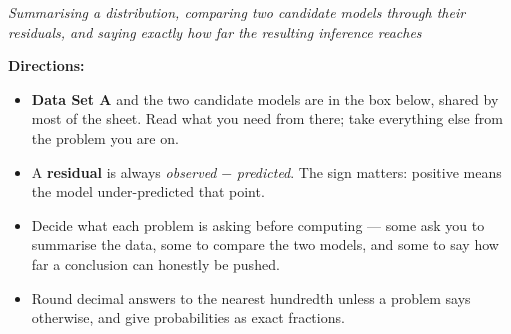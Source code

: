 \documentclass[12pt]{article}
\begin{document}

\begin{center}\small\textit{Summarising a distribution, comparing two candidate models
through their residuals, and saying exactly how far the resulting inference
reaches}\end{center}

\noindent\small\textbf{Directions:}
\begin{itemize}[label={$\bullet$}, leftmargin=1.1cm, itemsep=1pt, topsep=2pt]
  \item \textbf{Data Set A} and the two candidate models are in the box below, shared by
        most of the sheet. Read what you need from there; take everything else from the
        problem you are on.
  \item A \textbf{residual} is always \emph{observed} $-$ \emph{predicted}. The sign
        matters: positive means the model under-predicted that point.
  \item Decide what each problem is asking before computing --- some ask you to summarise
        the data, some to compare the two models, and some to say how far a conclusion
        can honestly be pushed.
  \item Round decimal answers to the nearest hundredth unless a problem says otherwise,
        and give probabilities as exact fractions.
\end{itemize}
\normalsize

\begin{center}
\end{center}
\end{document}
